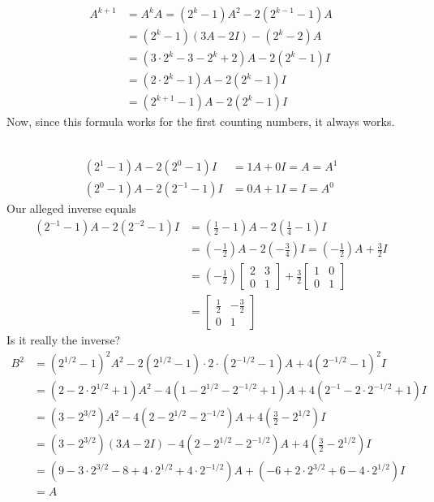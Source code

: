 \documentclass{article}
\begin{document}
\begin{description}
    \begin{align*}
    A^{k+1} & = A^k A = (2^k-1)A^2 - 2(2^{k-1}-1)A \\
            & = (2^k-1) (3A-2I) - (2^k-2)A \\
            & = (3 \cdot 2^k-3 - 2^k+2)A - 2(2^k-1)I \\
            & = (2 \cdot 2^k-1)A - 2(2^k-1)I \\
            & = (2^{k+1}-1)A - 2(2^k-1)I
    \end{align*}
    Now, since this formula works for the first counting numbers, it always works.

  \item[115.] $\ $
    \begin{align*}
    (2^1 - 1)A - 2(2^0 - 1)I & = 1A + 0I = A = A^1 \\
    (2^0 - 1)A - 2(2^{-1}-1)I & = 0A + 1I = I = A^0
    \end{align*}
    Our alleged inverse equals
    \begin{align*}
    (2^{-1}-1)A - 2(2^{-2}-1)I & = \left( \frac{1}{2} - 1 \right) A - 2 \left( \frac{1}{4} - 1 \right) I \\
                               & = \left( -\frac{1}{2} \right) A - 2 \left( -\frac{3}{4} \right) I = \left( -\frac{1}{2} \right) A + \frac{3}{2} I \\ 
                               & = \left( -\frac{1}{2} \right)  \begin{bmatrix} 2 & 3 \\ 0 & 1 \end{bmatrix}  +  \frac{3}{2}  \begin{bmatrix} 1 & 0 \\ 0 & 1 \end{bmatrix} \\
                               & = \begin{bmatrix} \frac{1}{2} & -\frac{3}{2} \\ 0 & 1 \end{bmatrix}
    \end{align*}
    Is it really the inverse?
    \begin{align*}
    B^2 & = (2^{1/2}-1)^2 A^2 - 2(2^{1/2}-1) \cdot 2 \cdot (2^{-1/2}-1)A + 4(2^{-1/2}-1)^2 I \\
        & = (2 - 2 \cdot 2^{1/2} + 1)A^2 - 4(1 - 2^{1/2} - 2^{-1/2} + 1)A + 4(2^{-1} - 2 \cdot 2^{-1/2} + 1)I \\
        & = (3 - 2^{3/2})A^2 - 4(2 - 2^{1/2} - 2^{-1/2})A + 4 \left( \frac{3}{2} - 2^{1/2} \right) I \\
        & = (3 - 2^{3/2}) (3A - 2I) - 4(2 - 2^{1/2} - 2^{-1/2})A + 4 \left( \frac{3}{2} - 2^{1/2} \right) I \\
        & = (9 - 3 \cdot 2^{3/2} - 8 + 4 \cdot 2^{1/2} + 4 \cdot 2^{-1/2})A + (-6 + 2 \cdot 2^{3/2} + 6 - 4 \cdot 2^{1/2})I \\ 
        & = A
    \end{align*}


\end{description}
\end{document}
